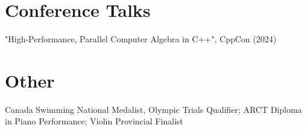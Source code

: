 \documentclass[letterpaper,10pt]{article}
\begin{document}
\section{Conference Talks}
\begin{itemize}[leftmargin=0.15in, label={}]
  \small{\item{"High-Performance, Parallel Computer Algebra in C++", CppCon (2024)}}
\end{itemize}

\section{Other}
\begin{itemize}[leftmargin=0.15in, label={}]
   \small{\item{
    {Canada Swimming National Medalist, Olympic Trials Qualifier; ARCT Diploma in Piano Performance}; Violin Provincial Finalist}}
\end{itemize}
\end{document}
